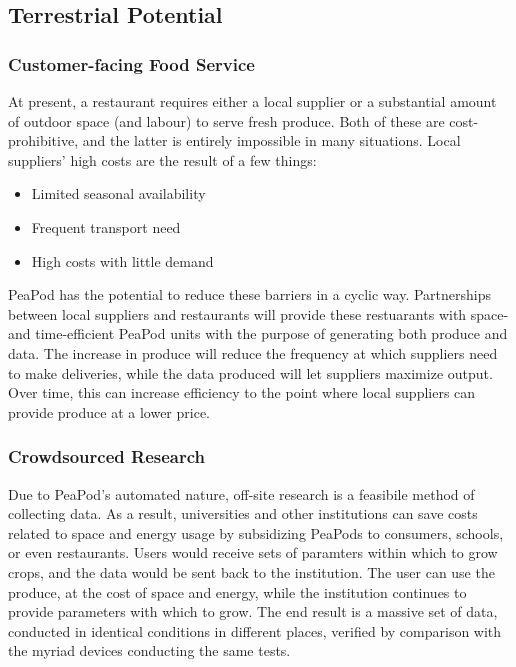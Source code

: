 \documentclass{report}
\begin{document}
\subsection{Terrestrial Potential}

\subsubsection{Customer-facing Food Service} %
At present, a restaurant requires either a local supplier or a substantial amount of outdoor space (and labour) to serve fresh produce. Both of these are cost-prohibitive, and the latter is entirely impossible in many situations. Local suppliers' high costs are the result of a few things:
\begin{itemize}
    \item Limited seasonal availability
    \item Frequent transport need
    \item High costs with little demand
\end{itemize}
PeaPod has the potential to reduce these barriers in a cyclic way. Partnerships between local suppliers and restaurants will provide these restuarants with space- and time-efficient PeaPod units with the purpose of generating both produce and data. The increase in produce will reduce the frequency at which suppliers need to make deliveries, while the data produced will let suppliers maximize output. Over time, this can increase efficiency to the point where local suppliers can provide produce at a lower price.

\subsubsection{Crowdsourced Research} %
Due to PeaPod's automated nature, off-site research is a feasibile method of collecting data. As a result, universities and other institutions can save costs related to space and energy usage by subsidizing PeaPods to consumers, schools, or even restaurants. Users would receive sets of paramters within which to grow crops, and the data would be sent back to the institution. The user can use the produce, at the cost of space and energy, while the institution continues to provide parameters with which to grow. The end result is a massive set of data, conducted in identical conditions in different places, verified by comparison with the myriad devices conducting the same tests.
\end{document}
